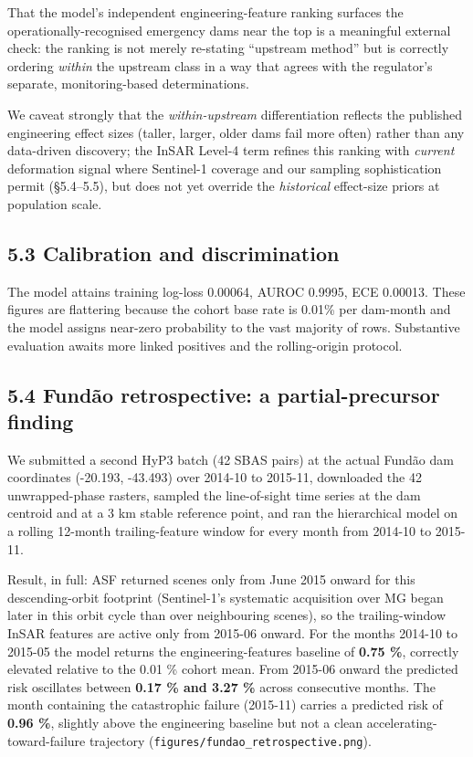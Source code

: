 \documentclass[
  11pt]{article}
\begin{document}
That the model's independent engineering-feature ranking surfaces the
operationally-recognised emergency dams near the top is a meaningful
external check: the ranking is not merely re-stating ``upstream method''
but is correctly ordering \emph{within} the upstream class in a way that
agrees with the regulator's separate, monitoring-based determinations.

We caveat strongly that the \emph{within-upstream} differentiation
reflects the published engineering effect sizes (taller, larger, older
dams fail more often) rather than any data-driven discovery; the InSAR
Level-4 term refines this ranking with \emph{current} deformation signal
where Sentinel-1 coverage and our sampling sophistication permit
(§5.4--5.5), but does not yet override the \emph{historical} effect-size
priors at population scale.

\subsection{5.3 Calibration and
discrimination}\label{calibration-and-discrimination}

The model attains training log-loss 0.00064, AUROC 0.9995, ECE 0.00013.
These figures are flattering because the cohort base rate is 0.01\% per
dam-month and the model assigns near-zero probability to the vast
majority of rows. Substantive evaluation awaits more linked positives
and the rolling-origin protocol.

\subsection{5.4 Fundão retrospective: a partial-precursor
finding}\label{funduxe3o-retrospective-a-partial-precursor-finding}

We submitted a second HyP3 batch (42 SBAS pairs) at the actual Fundão
dam coordinates (-20.193, -43.493) over 2014-10 to 2015-11, downloaded
the 42 unwrapped-phase rasters, sampled the line-of-sight time series at
the dam centroid and at a 3 km stable reference point, and ran the
hierarchical model on a rolling 12-month trailing-feature window for
every month from 2014-10 to 2015-11.

Result, in full: ASF returned scenes only from June 2015 onward for this
descending-orbit footprint (Sentinel-1's systematic acquisition over MG
began later in this orbit cycle than over neighbouring scenes), so the
trailing-window InSAR features are active only from 2015-06 onward. For
the months 2014-10 to 2015-05 the model returns the engineering-features
baseline of \textbf{0.75 \%}, correctly elevated relative to the 0.01 \%
cohort mean. From 2015-06 onward the predicted risk oscillates between
\textbf{0.17 \% and 3.27 \%} across consecutive months. The month
containing the catastrophic failure (2015-11) carries a predicted risk
of \textbf{0.96 \%}, slightly above the engineering baseline but not a
clean accelerating-toward-failure trajectory
(\texttt{figures/fundao\_retrospective.png}).
\end{document}
